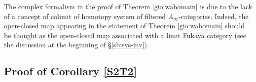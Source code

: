 \begin{rem}
	The complex formalism in the proof of Theorem \ref{gio:wabomain} is due to the lack of a concept of colimit of homotopy system of filtered $A_\infty$-categories. Indeed, the open-closed map appearing in the statement of Theorem \ref{gio:wabomain} should be thought as the open-closed map associated with a limit Fukaya category (see the discussion at the beginning of \S\ref{sb:sys-inv}).
\end{rem}








%	
	
	
	\subsection{Proof of Corollary \ref{S2T2}}\label{gio:proofS2T2}
	
	